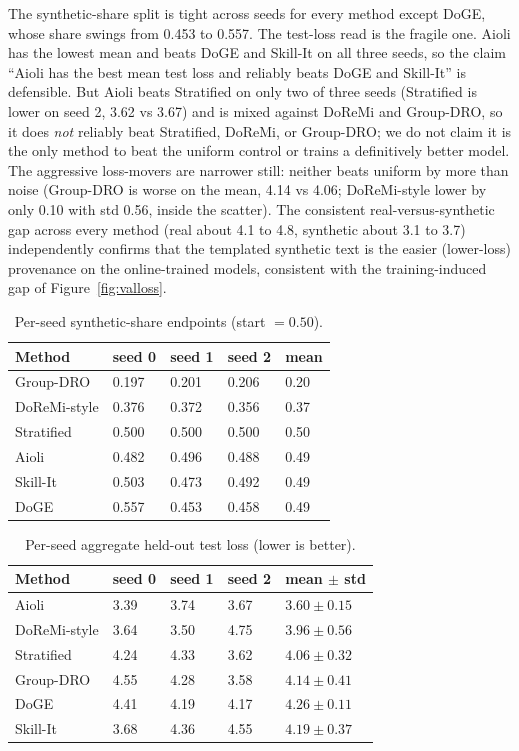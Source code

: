 \documentclass{article}
\begin{document}
The synthetic-share split is tight across seeds for every method except DoGE, whose share swings from 0.453 to 0.557. The test-loss read is the fragile one. Aioli has the lowest mean and beats DoGE and Skill-It on all three seeds, so the claim ``Aioli has the best mean test loss and reliably beats DoGE and Skill-It'' is defensible. But Aioli beats Stratified on only two of three seeds (Stratified is lower on seed 2, 3.62 vs 3.67) and is mixed against DoReMi and Group-DRO, so it does \emph{not} reliably beat Stratified, DoReMi, or Group-DRO; we do not claim it is the only method to beat the uniform control or trains a definitively better model. The aggressive loss-movers are narrower still: neither beats uniform by more than noise (Group-DRO is worse on the mean, 4.14 vs 4.06; DoReMi-style lower by only 0.10 with std 0.56, inside the scatter). The consistent real-versus-synthetic gap across every method (real about 4.1 to 4.8, synthetic about 3.1 to 3.7) independently confirms that the templated synthetic text is the easier (lower-loss) provenance on the online-trained models, consistent with the training-induced gap of Figure~\ref{fig:valloss}.

\begin{table}[t]
\centering
\small
\caption{Per-seed synthetic-share endpoints (start $=0.50$).}
\label{tab:perseed-share}
\begin{tabular}{lllll}
\toprule
Method & seed 0 & seed 1 & seed 2 & mean \\
\midrule
Group-DRO & 0.197 & 0.201 & 0.206 & 0.20 \\
DoReMi-style & 0.376 & 0.372 & 0.356 & 0.37 \\
Stratified & 0.500 & 0.500 & 0.500 & 0.50 \\
Aioli & 0.482 & 0.496 & 0.488 & 0.49 \\
Skill-It & 0.503 & 0.473 & 0.492 & 0.49 \\
DoGE & 0.557 & 0.453 & 0.458 & 0.49 \\
\bottomrule
\end{tabular}
\end{table}

\begin{table}[t]
\centering
\small
\caption{Per-seed aggregate held-out test loss (lower is better).}
\label{tab:perseed-test}
\begin{tabular}{lllll}
\toprule
Method & seed 0 & seed 1 & seed 2 & mean $\pm$ std \\
\midrule
Aioli & 3.39 & 3.74 & 3.67 & $3.60 \pm 0.15$ \\
DoReMi-style & 3.64 & 3.50 & 4.75 & $3.96 \pm 0.56$ \\
Stratified & 4.24 & 4.33 & 3.62 & $4.06 \pm 0.32$ \\
Group-DRO & 4.55 & 4.28 & 3.58 & $4.14 \pm 0.41$ \\
DoGE & 4.41 & 4.19 & 4.17 & $4.26 \pm 0.11$ \\
Skill-It & 3.68 & 4.36 & 4.55 & $4.19 \pm 0.37$ \\
\bottomrule
\end{tabular}
\end{table}
\end{document}
